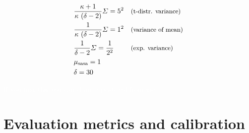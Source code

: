 \documentclass[\ifafour a4paper,12pt,\else a5paper,10pt,\fi%
onecolumn,oneside,article,%
british%
]{memoir}
\makeatletter
\theoremstyle{remark}
\theoremstyle{innote}
\def\sum{\DOTSI\sumop\slimits@}
\newcommand*{\de}{\partialup}%
\newcommand*{\p}{\mathrm{p}}%
\renewcommand*{\|}[1][]{\nonscript\:#1\vert\nonscript\:\mathopen{}}
\renewcommand*{\=}{\TextOrMath\texteq\eq}
\newcommand*{\tsum}{\mathop{\textstyle\sum}\nolimits}
\newcommand*{\yF}{\bm{F}}
\makeatother
\begin{document}
\begin{equation}
  \label{eq:requirements_hyperparams}
  \begin{aligned}
   &\frac{\kappa+1}{\kappa\ (\delta-2)}\varSigma = 5^{2}
&&\text{\small(t-distr. variance)}
    \\
    &\frac{1}{\kappa\ (\delta-2)}\varSigma = 1^{2}
&&\text{\small(variance of mean)}
    \\
    &\frac{1}{\delta-2}\varSigma = \frac{1}{2^{2}}
&&\text{\small(exp. variance)}
    \\
    &\mu_{\text{sasa}} = 1 &&
    \\
    &\delta = 30 &&
  \end{aligned}
\end{equation}




\textcolor{white}{If you find this you can claim a postcard from me.}

\section{Evaluation metrics and calibration}
\label{sec:evaluation}







\end{document}
